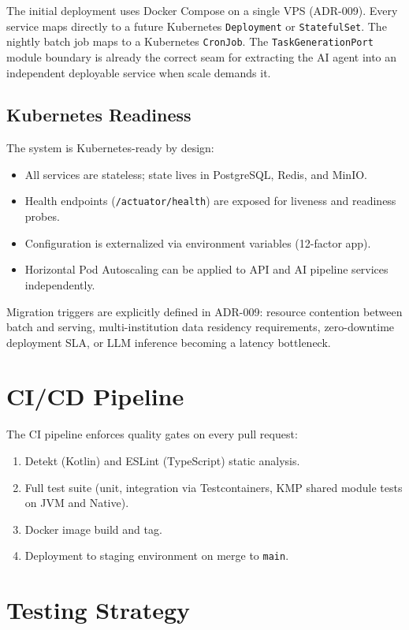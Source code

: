 The initial deployment uses Docker Compose on a single VPS (ADR-009). Every service maps directly to a future Kubernetes \texttt{Deployment} or \texttt{StatefulSet}. The nightly batch job maps to a Kubernetes \texttt{CronJob}. The \texttt{TaskGenerationPort} module boundary is already the correct seam for extracting the AI agent into an independent deployable service when scale demands it.

\subsection{Kubernetes Readiness}
\label{ssec:k8s}

The system is Kubernetes-ready by design:
\begin{itemize}
    \item All services are stateless; state lives in PostgreSQL, Redis, and MinIO.
    \item Health endpoints (\texttt{/actuator/health}) are exposed for liveness and readiness probes.
    \item Configuration is externalized via environment variables (12-factor app).
    \item Horizontal Pod Autoscaling can be applied to API and AI pipeline services independently.
\end{itemize}

Migration triggers are explicitly defined in ADR-009: resource contention between batch and serving, multi-institution data residency requirements, zero-downtime deployment SLA, or LLM inference becoming a latency bottleneck.

\section{CI/CD Pipeline}
\label{sec:cicd}

The CI pipeline enforces quality gates on every pull request:
\begin{enumerate}
    \item Detekt (Kotlin) and ESLint (TypeScript) static analysis.
    \item Full test suite (unit, integration via Testcontainers, KMP shared module tests on JVM and Native).
    \item Docker image build and tag.
    \item Deployment to staging environment on merge to \texttt{main}.
\end{enumerate}

\section{Testing Strategy}
\label{sec:testing}

